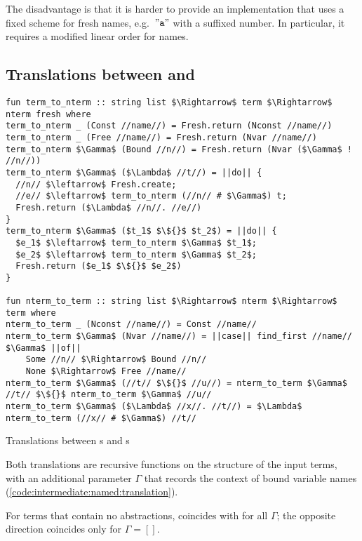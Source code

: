 \noindent
The disadvantage is that it is harder to provide an implementation that uses a fixed scheme for fresh names, e.g.\ $\mathtt{"a"}$ with a suffixed number.
In particular, it requires a modified linear order for names.

\subsection{Translations between  and }
\label{sec:intermediate:named:trans}

\begin{code}[t]
  \begin{lstlisting}[language=Isabelle]
fun term_to_nterm :: string list $\Rightarrow$ term $\Rightarrow$ nterm fresh where
term_to_nterm _ (Const //name//) = Fresh.return (Nconst //name//)
term_to_nterm _ (Free //name//) = Fresh.return (Nvar //name//)
term_to_nterm $\Gamma$ (Bound //n//) = Fresh.return (Nvar ($\Gamma$ ! //n//))
term_to_nterm $\Gamma$ ($\Lambda$ //t//) = ||do|| {
  //n// $\leftarrow$ Fresh.create;
  //e// $\leftarrow$ term_to_nterm (//n// # $\Gamma$) t;
  Fresh.return ($\Lambda$ //n//. //e//)
}
term_to_nterm $\Gamma$ ($t_1$ $\${}$ $t_2$) = ||do|| {
  $e_1$ $\leftarrow$ term_to_nterm $\Gamma$ $t_1$;
  $e_2$ $\leftarrow$ term_to_nterm $\Gamma$ $t_2$;
  Fresh.return ($e_1$ $\${}$ $e_2$)
}

fun nterm_to_term :: string list $\Rightarrow$ nterm $\Rightarrow$ term where
nterm_to_term _ (Nconst //name//) = Const //name//
nterm_to_term $\Gamma$ (Nvar //name//) = ||case|| find_first //name// $\Gamma$ ||of||
    Some //n// $\Rightarrow$ Bound //n//
    None $\Rightarrow$ Free //name//
nterm_to_term $\Gamma$ (//t// $\${}$ //u//) = nterm_to_term $\Gamma$ //t// $\${}$ nterm_to_term $\Gamma$ //u//
nterm_to_term $\Gamma$ ($\Lambda$ //x//. //t//) = $\Lambda$ nterm_to_term (//x// # $\Gamma$) //t//\end{lstlisting}
  \caption{Translations between s and s}
  \label{code:intermediate:named:translation}
\end{code}

\noindent
Both translations are recursive functions on the structure of the input terms, with an additional parameter $\Gamma$ that records the context of bound variable names (\cref{code:intermediate:named:translation}).

For terms that contain no abstractions,  coincides with  for all $\Gamma$; the opposite direction coincides only for $\Gamma = []$.

